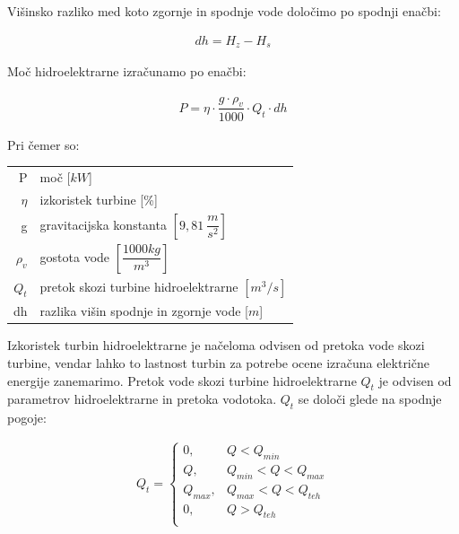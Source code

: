 Višinsko razliko med koto zgornje in spodnje vode določimo po spodnji enačbi:

\begin{ceqn}
\begin{align}
dh = H_z - H_s
\end{align}
\end{ceqn}

Moč hidroelektrarne izračunamo po enačbi:

\begin{ceqn}
\begin{align}
P = \eta \cdot \dfrac{g \cdot \rho_v}{1000} \cdot Q_t \cdot dh \label{eq:mocHidroelektrarne}
\end{align}
\end{ceqn}

Pri čemer so:
\begin{table}[htb!]
	\begin{tabular}{r|p{10cm}}
		P & moč [$kW$]\\
		$\eta$ & izkoristek turbine [\%]\\
		g & gravitacijska konstanta $\left[9,81~\dfrac{m}{s^{2}}\right]$ \\
		$\rho_v$&gostota vode $\left[\dfrac{1000 kg}{m^3}\right]$\\
		$Q_t$ & pretok skozi turbine hidroelektrarne $\left[m^{3}/s \right]$\\
		dh & razlika višin spodnje in zgornje vode [$m$]
	\end{tabular}
\end{table}




Izkoristek turbin hidroelektrarne je načeloma odvisen od pretoka vode skozi turbine, vendar lahko to lastnost turbin za potrebe ocene izračuna električne energije zanemarimo. Pretok vode skozi turbine hidroelektrarne $Q_t$ je odvisen od parametrov hidroelektrarne in pretoka vodotoka. $Q_t$ se določi glede na spodnje pogoje:

\begin{ceqn}
	\begin{align}
	Q_t = \begin{cases}
	0, &Q < Q_{min}\\
	Q, &Q_{min} < Q < Q_{max}\\
	Q_{max}, &Q_{max}< Q < Q_{teh}\\
	0, &Q > Q_{teh}\\
	\end{cases}
	\end{align}
\end{ceqn}

